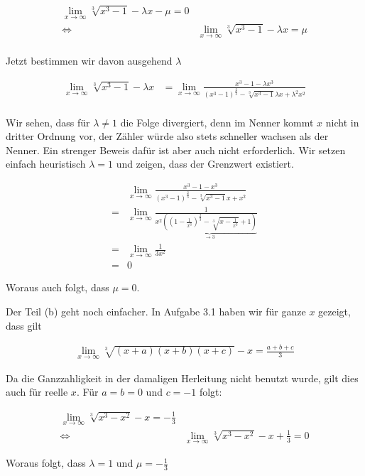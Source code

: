\documentclass[a4paper,german,12pt,smallheadings]{scrartcl}
\begin{document}
\begin{align*}
  \lim_{x \to \infty} \sqrt[3]{x^3 - 1} - \lambda x - \mu = 0\\
  \Leftrightarrow\quad&\lim_{x \to \infty} \sqrt[3]{x^3 - 1} - \lambda x = \mu \\
\end{align*}

Jetzt bestimmen wir davon ausgehend $\lambda$

\begin{align*}
  \lim_{x \to \infty} \sqrt[3]{x^3 - 1} - \lambda x &= \lim_{x \to \infty} \frac{x^3 - 1 - \lambda x^3}{(x^3 - 1)^\frac{2}{3} - \sqrt[3]{x^3 - 1}\lambda x + \lambda^2 x^2} \\
\end{align*}

Wir sehen, dass für $\lambda \neq 1$ die Folge divergiert, denn im Nenner kommt
$x$ nicht in dritter Ordnung vor, der Zähler würde also stets schneller wachsen
als der Nenner. Ein strenger Beweis dafür ist aber auch nicht erforderlich. Wir
setzen einfach heuristisch $\lambda = 1$ und zeigen, dass der Grenzwert
existiert.

\begin{align*}
  &\lim_{x \to \infty} \frac{x^3 - 1 - x^3}{(x^3 - 1)^\frac{2}{3} - \sqrt[3]{x^3 - 1}x + x^2} \\
  =&\lim_{x \to \infty} \frac{1}{x^2 \underbrace{((1 - \frac{1}{x^3})^\frac{2}{3} - \sqrt[3]{x - \frac{1}{x^3}} + 1)}_{\to 3}} \\
  =&\lim_{x \to \infty} \frac{1}{3x^2} \\
  =& 0
\end{align*}

Woraus auch folgt, dass $\mu = 0$.

Der Teil (b) geht noch einfacher. In Aufgabe 3.1 haben wir für ganze $x$
gezeigt, dass gilt

\begin{align*}
  \lim_{x \to \infty} \sqrt[3]{(x+a)(x+b)(x+c)} - x = \frac{a+b+c}{3}
\end{align*}

Da die Ganzzahligkeit in der damaligen Herleitung nicht benutzt wurde, gilt
dies auch für reelle $x$. Für $a = b = 0$ und $c = -1$ folgt:

\begin{align*}
  \lim_{x \to \infty} \sqrt[3]{x^3 - x^2} - x = -\frac{1}{3} \\
  \Leftrightarrow\quad &\lim_{x \to \infty} \sqrt[3]{x^3 - x^2} - x + \frac{1}{3} = 0
\end{align*}

Woraus folgt, dass $\lambda = 1$ und $\mu = -\frac{1}{3}$
\end{document}
